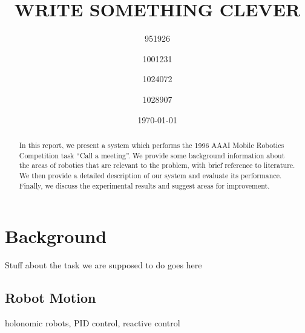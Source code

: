 \documentclass[conference]{IEEEtran}
\title{WRITE SOMETHING CLEVER}
\author{951926 \and 1001231 \and 1024072 \and 1028907}
\date{\today}
\begin{document}
\maketitle

\begin{abstract}
  In this report, we present a system which performs the 1996 AAAI Mobile Robotics Competition task ``Call a meeting''\cite{AAAIcomp}. We provide some background information about the areas of robotics that are relevant to the problem, with brief reference to literature. We then provide a detailed description of our system and evaluate its performance. Finally, we discuss the experimental results and suggest areas for improvement.
\end{abstract}
\section{Background}
Stuff about the task we are supposed to do goes here
\subsection{Robot Motion}
holonomic robots, PID control, reactive control
\end{document}
